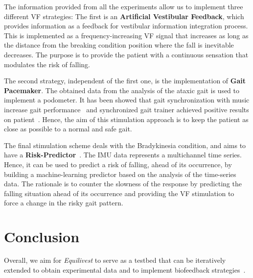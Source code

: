 \documentclass[conference]{IEEEtran}
\begin{document}
The information provided from all the experiments allow us to implement three different VF strategies:  The first is an \textbf{Artificial Vestibular Feedback}, which provides information as a feedback for vestibular information integration process.  This is implemented as a frequency-increasing VF signal that increases as long as the distance from the breaking condition position where the fall is inevitable decreases.   The purpose is to provide the patient with a continuous sensation that modulates the risk of falling.

The second strategy, independent of the first one, is the implementation of \textbf{Gait Pacemaker}.  The obtained data from the analysis of the ataxic gait is used to implement a podometer.  It has been showed that gait synchronization with music increase gait performance~\cite{Roerdink.etal2007} and synchronized gait trainer achieved positive results on patient~\cite{Blicher.etal2009}.  Hence, the aim of this stimulation approach is to keep the patient as close as possible to a normal and safe gait.

The final stimulation scheme deals with the Bradykinesia condition, and aims to have a \textbf{Risk-Predictor}~\cite{Rahman.etal2022,Ali.etal2022}.  The IMU data  represents a multichannel time series.  Hence, it can be used to predict a risk of falling, ahead of its occurrence, by building a machine-learning predictor based on the analysis of the time-series data.  The rationale is to counter the slowness of the response by predicting the falling situation ahead of its occurrence and providing the VF stimulation to force a change in the risky gait pattern.



\section*{Conclusion}
Overall, we aim for \textit{Equilivest} to serve as a testbed that can be iteratively extended to obtain experimental data and to implement biofeedback strategies~\cite{Bowman2021}.
\end{document}
